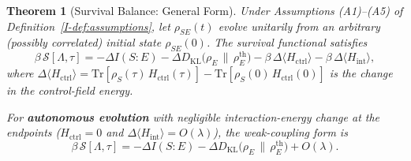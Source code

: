 \documentclass[12pt,a4paper,openany]{book}
\newtheorem{theorem}{Theorem}[chapter]
\begin{document}
\begin{theorem}[Survival Balance: General Form]
\label{I-thm:advantage}
Under Assumptions \textup{(A1)--(A5)} of
Definition~\ref{I-def:assumptions},
let $\rho_{SE}(t)$ evolve unitarily from an \emph{arbitrary}
(possibly correlated) initial state $\rho_{SE}(0)$.
The survival functional
satisfies
\begin{equation}
\label{I-eq:advantage}
\boxed{\;
\beta\,\mathcal{S}[\Lambda,\tau]
= -\Delta I(S{:}E)
  - \Delta D_{\mathrm{KL}}\!\bigl(\rho_E \,\big\|\,
    \rho_E^{\mathrm{th}}\bigr)
  - \beta\,\Delta\langle H_{\mathrm{ctrl}} \rangle
  - \beta\,\Delta\langle H_{\mathrm{int}} \rangle,
\;}
\end{equation}
where $\Delta\langle H_{\mathrm{ctrl}} \rangle
= \mathrm{Tr}[\rho_S(\tau)\, H_{\mathrm{ctrl}}(\tau)]
  - \mathrm{Tr}[\rho_S(0)\, H_{\mathrm{ctrl}}(0)]$
is the change in the control-field energy.

For \textbf{autonomous evolution} with negligible interaction-energy
change at the endpoints
($H_{\mathrm{ctrl}} = 0$ and
$\Delta\langle H_{\mathrm{int}}\rangle=O(\lambda)$),
the weak-coupling form is
\begin{equation}
\label{I-eq:advantage_auto}
\beta\,\mathcal{S}[\Lambda,\tau]
= -\Delta I(S{:}E)
  - \Delta D_{\mathrm{KL}}\!\bigl(\rho_E \,\big\|\,
    \rho_E^{\mathrm{th}}\bigr)+O(\lambda).
\end{equation}
\end{theorem}
\end{document}
